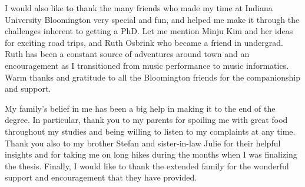 I would also like to thank the many friends who made my time at Indiana University Bloomington very special and fun, and helped me make it through the challenges inherent to getting a PhD. Let me mention Minju Kim and her ideas for exciting road trips, and Ruth Osbrink who became a friend in undergrad. Ruth has been a constant source of adventures around town and an encouragement as I transitioned from music performance to music informatics. Warm thanks and gratitude to all the Bloomington friends for the companionship and support.

My family’s belief in me has been a big help in making it to the end of the degree. In particular, thank you to my parents for spoiling me with great food throughout my studies and being willing to listen to my complaints at any time. Thank you also to my brother Stefan and sister-in-law Julie for their helpful insights and for taking me on long hikes during the months when I was finalizing the thesis. Finally, I would like to thank the extended family for the wonderful support and encouragement that they have provided.


